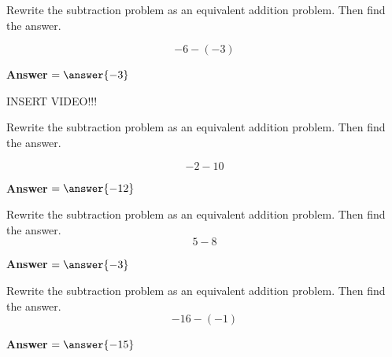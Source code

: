 \documentclass{ximera}[font=12pt]
\begin{document}
\begin{problem}
Rewrite the subtraction problem as an equivalent addition problem.  Then find the answer.

\[ -6 - (-3) \]

\begin{multipleChoice}
\end{multipleChoice}


\textcolor{orange!80!black}{\textbf{Answer}}  $ = \answer{-3}$

\end{problem}


INSERT VIDEO!!!


\begin{problem}
Rewrite the subtraction problem as an equivalent addition problem.  Then find the answer.

\[ -2 - 10 \]

\begin{multipleChoice}
\end{multipleChoice}

\textcolor{orange!80!black}{\textbf{Answer}} $ = \answer{-12}$

\end{problem}

\begin{problem} 
Rewrite the subtraction problem as an equivalent addition problem. Then find the answer. 
\[ 5 - 8 \] 
\begin{multipleChoice} 

\end{multipleChoice} 
\textcolor{orange!80!black}{\textbf{Answer}} $ = \answer{-3}$ 
\end{problem}

\begin{problem} 
Rewrite the subtraction problem as an equivalent addition problem. Then find the answer. 
\[ -16 - (-1) \] 
\begin{multipleChoice} 
\end{multipleChoice} 
\textcolor{orange!80!black}{\textbf{Answer}} $ = \answer{-15}$ 
\end{problem}
\end{document}
